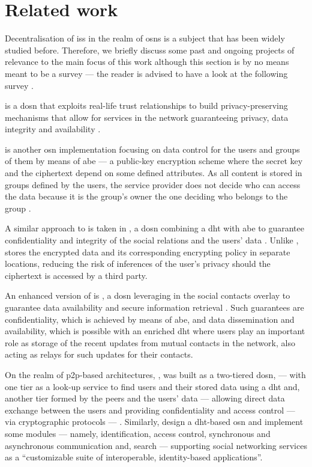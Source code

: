 \section{Related work}
    \label{section:thesis:related-work}
Decentralisation of \acp{is} in the realm of \acp{osn} is a subject that has been 
widely studied before. Therefore, we briefly discuss some past and ongoing projects 
of relevance to the main focus of this work although this section is by no means 
meant to be a survey --- the reader is advised to have a look at the following 
survey \cite{PaulFS14}.

\Safebook is a \ac{dosn} that exploits real-life trust relationships to build privacy-preserving 
mechanisms that allow for services in the network guaranteeing privacy, data integrity 
and availability \cite{CutilloMS09}. 

\Persona is another \ac{osn} implementation focusing on data control for the users 
and groups of them by means of \ac{abe} --- a public-key encryption scheme where 
the secret key and the ciphertext depend on some defined attributes. As all content 
is stored in groups defined by the users, the service provider does not decide who 
can access the data because it is the group's owner the one deciding who belongs 
to the group \cite{BadenBSBS09}.

A similar approach to \Persona is taken in \DECENT, a \ac{dosn} combining a \ac{dht} 
with \ac{abe} to guarantee confidentiality and integrity of the social relations and 
the users' data \cite{JahidNMBK12}. Unlike \Persona, \DECENT stores the encrypted 
data and its corresponding encrypting policy in separate locations, reducing the 
risk of inferences of the user's privacy should the ciphertext is accessed by a 
third party.

An enhanced version of \DECENT is \Cachet, a \ac{dosn} leveraging in the social 
contacts overlay to guarantee data availability and secure information retrieval 
\cite{NilizadehJMBK12}. Such guarantees are confidentiality, which is achieved by 
means of \ac{abe}, and data dissemination and availability, which is possible with 
an enriched \ac{dht} where users play an important role as storage of the recent 
updates from mutual contacts in the network, also acting as relays for such updates 
for their contacts.

On the realm of \ac{p2p}-based architectures, \PeerSoN, was built as a two-tiered 
\ac{dosn},  --- with one tier as a look-up service to find users and their stored 
data using a \ac{dht} and, another tier formed by the peers and the users' data 
--- allowing direct data exchange between the users and providing confidentiality 
and access control --- via cryptographic protocols --- \cite{BucheggerSVD09}. Similarly, 
\cite{AielloR10} design a \ac{dht}-based \ac{osn} and implement some modules --- 
namely, identification, access control, synchronous and asynchronous communication 
and, search --- supporting social networking services as a ``customizable suite 
of interoperable, identity-based applications''.

